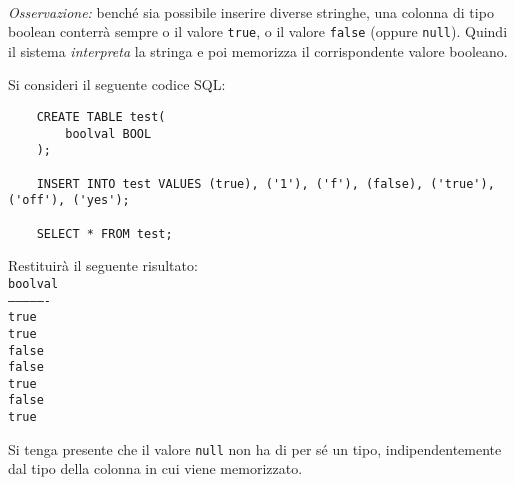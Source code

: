 \documentclass[12pt,a4paper]{book}
\begin{document}
	\paragraph{}\textit{Osservazione:} benché sia possibile inserire diverse stringhe, una colonna di tipo boolean conterrà sempre o il valore \texttt{true}, o il valore \texttt{false} (oppure \texttt{null}). Quindi il sistema \textit{interpreta} la stringa e poi memorizza il corrispondente valore booleano.\\ 
	\begin{tcolorbox}[enhanced jigsaw, breakable, title=Esempio, title filled]
	Si consideri il seguente codice SQL:
	\begin{lstlisting}
	CREATE TABLE test(
		boolval BOOL
	);
		
	INSERT INTO test VALUES (true), ('1'), ('f'), (false), ('true'), ('off'), ('yes');
		
	SELECT * FROM test;
	\end{lstlisting}
	Restituirà il seguente risultato:\vspace{10px}\\
	\texttt{boolval\\----------------\\true\\true\\false\\false\\true\\false\\true}\vspace{10px}\\
	\end{tcolorbox}
	Si tenga presente che il valore \texttt{null} non ha di per sé un tipo, indipendentemente dal tipo della colonna in cui viene memorizzato.
\end{document}
